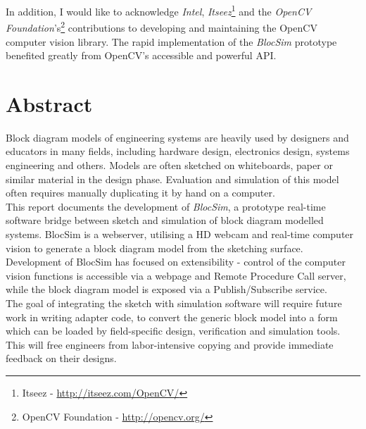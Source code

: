 In addition, I would like to acknowledge \textit{Intel}, \textit{Itseez}\footnote{Itseez - \url{http://itseez.com/OpenCV/}} and the \textit{OpenCV Foundation}'s\footnote{OpenCV Foundation - \url{http://opencv.org/}} contributions to developing and maintaining the OpenCV computer vision library. The rapid implementation of the \textit{BlocSim} prototype benefited greatly from OpenCV's accessible and powerful API.


\chapter{Abstract}

Block diagram models of engineering systems are heavily used by designers and educators in many fields, including hardware design, electronics design, systems engineering and others. Models are often sketched on whiteboards, paper or similar material in the design phase. Evaluation and simulation of this model often requires manually duplicating it by hand on a computer.
\\

This report documents the development of \textit{BlocSim}, a prototype real-time software bridge between sketch and simulation of block diagram modelled systems. BlocSim is a webserver, utilising a HD webcam and real-time computer vision to generate a block diagram model from the sketching surface. Development of BlocSim has focused on extensibility - control of the computer vision functions is accessible via a webpage and Remote Procedure Call server, while the block diagram model is exposed via a Publish/Subscribe service.
\\

The goal of integrating the sketch with simulation software will require future work in writing adapter code, to convert the generic block model into a form which can be loaded by field-specific design, verification and simulation tools. This will free engineers from labor-intensive copying and provide immediate feedback on their designs.


\begin{comment}

\end{comment}
